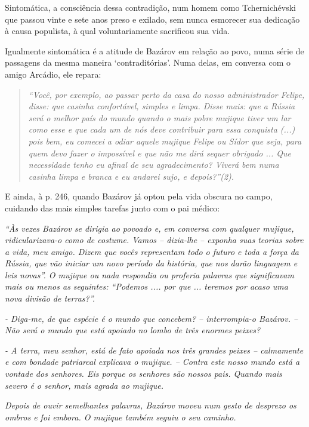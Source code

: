 Sintomática, a consciência dessa contradição, num homem como
Tchernichévski que passou vinte e sete anos preso e exilado, sem nunca
esmorecer sua dedicação à causa populista, à qual voluntariamente
sacrificou sua vida.

Igualmente sintomática é a atitude de Bazárov em relação ao povo, numa
série de passagens da mesma maneira `contraditórias'. Numa delas, em
conversa com o amigo Arcádio, ele repara:

\begin{quote}
\emph{``Você, por exemplo, ao passar perto da casa do nosso
administrador Felipe, disse: que casinha confortável, simples e limpa.
Disse mais: que a Rússia será o melhor país do mundo quando o mais pobre
mujique tiver um lar como esse e que cada um de nós deve contribuir para
essa conquista (...) pois bem, eu comecei a odiar aquele mujique Felipe
ou Sídor que seja, para quem devo fazer o impossível e que não me dirá
sequer obrigado ... Que necessidade tenho eu afinal de seu
agradecimento? Viverá bem numa casinha limpa e branca e eu andarei sujo,
e depois?''(2). }
\end{quote}

E ainda, à p. 246, quando Bazárov já optou pela vida obscura no campo,
cuidando das mais simples tarefas junto com o pai médico:

\emph{``Às vezes Bazárov se dirigia ao povoado e, em conversa com
qualquer mujique, ridicularizava-o como de costume. Vamos -- dizia-lhe
-- exponha suas teorias sobre a vida, meu amigo. Dizem que vocês
representam todo o futuro e toda a força da Rússia, que vão iniciar um
novo período da história, que nos darão linguagem e leis novas''. O
mujique ou nada respondia ou proferia palavras que significavam mais ou
menos as seguintes: ``Podemos .... por que ... teremos por acaso uma
nova divisão de terras?''.}

\emph{- Diga-me, de que espécie é o mundo que concebem? -- interrompia-o
Bazárov. -- Não será o mundo que está apoiado no lombo de três enormes
peixes?}

\emph{- A terra, meu senhor, está de fato apoiada nos três grandes
peixes -- calmamente e com bondade patriarcal explicava o mujique. --
Contra este nosso mundo está a vontade dos senhores. Eis porque os
senhores são nossos pais. Quando mais severo é o senhor, mais agrada ao
mujique. }

\emph{Depois de ouvir semelhantes palavras, Bazárov moveu num gesto de
desprezo os ombros e foi embora. O mujique também seguiu o seu caminho.}

